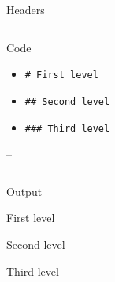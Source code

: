 \documentclass[
  ignorenonframetext,
]{beamer}
\begin{document}
\begin{frame}[fragile]

\begin{columns}[T]
\begin{block}{Headers}

\begin{column}{0.48\textwidth}
\begin{block}{Code}

\begin{itemize}
\item
  \texttt{\#\ First\ level}
\item
  \texttt{\#\#\ Second\ level}
\item
  \texttt{\#\#\#\ Third\ level}
\end{itemize}

--

\end{block}
\end{column}

\begin{column}{0.48\textwidth}
\begin{block}{Output}

\end{block}

\begin{block}{First level}

\begin{block}{Second level}

\begin{block}{Third level}

\end{block}

\end{block}

\end{block}
\end{column}

\end{block}
\end{columns}

\end{frame}

\begin{frame}

\end{frame}
\end{document}
